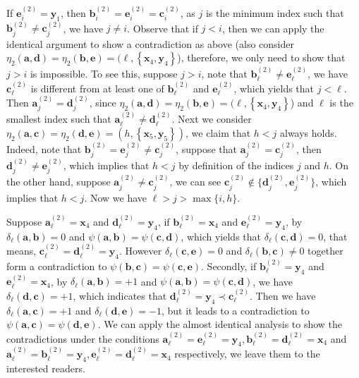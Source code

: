 \documentclass[11pt]{article}
\theoremstyle{definition}
\newcommand{\aaa}{\boldsymbol{a}}
\newcommand{\bb}{\boldsymbol{b}}
\newcommand{\cc}{\boldsymbol{c}}
\newcommand{\dd}{\boldsymbol{d}}
\newcommand{\ee}{\boldsymbol{e}}
\begin{document}
\begin{Case}
\begin{Case}
        \item If $\ee_{i}^{(2)}=\boldsymbol{y}_{1}$, then $\bb_{i}^{(2)}=\ee_{i}^{(2)}=\cc_{i}^{(2)}$, as $j$ is the minimum index such that $\bb_{j}^{(2)}\neq\cc_{j}^{(2)}$, we have $j\neq i$. Observe that if $j<i$, then we can apply the identical argument to show a contradiction as above (also consider $\eta_{2}(\aaa,\dd)=\eta_{2}(\bb,\ee)=(\ell,\left\{\boldsymbol{x}_{4},\boldsymbol{y}_{4}\right\}$), therefore, we only need to show that $j>i$ is impossible. To see this, suppose $j>i$, note that $\bb_{\ell}^{(2)}\neq \ee_{\ell}^{(2)}$, we have $\cc_{\ell}^{(2)}$ is different from at least one of $\bb_{\ell}^{(2)}$ and $\ee_{\ell}^{(2)}$, which yields that $j<\ell$. Then  $\aaa_{j}^{(2)}=\dd_{j}^{(2)}$, since $\eta_{2}(\aaa,\dd)=\eta_{2}(\bb,\ee)=(\ell,\left\{\boldsymbol{x}_{4},\boldsymbol{y}_{4}\right\}$) and $\ell$ is the smallest index such that $\aaa_{\ell}^{(2)}\neq\dd_{\ell}^{(2)}$. Next we consider $\eta_{2}(\aaa,\cc)=\eta_{2}(\dd,\ee)=(h,\left\{\boldsymbol{x}_{5},\boldsymbol{y}_{5}\right\})$, we claim that $h<j$ always holds. Indeed, note that $\bb_{j}^{(2)}=\ee_{j}^{(2)}\neq\cc_{j}^{(2)}$, suppose that $\aaa_{j}^{(2)}=\cc_{j}^{(2)}$, then $\dd_{j}^{(2)}\neq\ee_{j}^{(2)}$, which implies that $h<j$ by definition of the indices $j$ and $h$. On the other hand, suppose $\aaa_{j}^{(2)}\neq\cc_{j}^{(2)}$, we can see $\cc_{j}^{(2)}\notin\{\dd_{j}^{(2)},\ee_{j}^{(2)}\}$, which implies that $h<j$. Now we have $\ell>j> \max\{i,h\}$.
        
         Suppose $\aaa_{\ell}^{(2)}=\boldsymbol{x}_{4}$ and $\dd_{\ell}^{(2)}=\boldsymbol{y}_{4}$, if $\bb_{\ell}^{(2)}=\boldsymbol{x}_{4}$ and $\ee_{\ell}^{(2)}=\boldsymbol{y}_{4}$, by $\delta_{\ell}(\aaa,\bb)=0$ and $\psi(\aaa,\bb)=\psi(\cc,\dd)$, which yields that $\delta_{\ell}(\cc,\dd)=0$, that means, $\cc_{\ell}^{(2)}=\dd_{\ell}^{(2)}=\boldsymbol{y}_{4}$. However $\delta_{\ell}(\cc,\ee)=0$ and $\delta_{\ell}(\bb,\cc)\neq 0$ together form a contradiction to $\psi(\bb,\cc)=\psi(\cc,\ee)$. Secondly, if $\bb_{\ell}^{(2)}=\boldsymbol{y}_{4}$ and $\ee_{\ell}^{(2)}=\boldsymbol{x}_{4}$, by $\delta_{\ell}(\aaa,\bb)=+1$ and $\psi(\aaa,\bb)=\psi(\cc,\dd)$, we have $\delta_{\ell}(\dd,\cc)=+1$, which indicates that $\dd_{\ell}^{(2)}=\boldsymbol{y}_{4}\prec\cc_{\ell}^{(2)}$. Then we have $\delta_{\ell}(\aaa,\cc)=+1$ and $\delta_{\ell}(\dd,\ee)=-1$, but it leads to a contradiction to $\psi(\aaa,\cc)=\psi(\dd,\ee)$. We can apply the almost identical analysis to show the contradictions under the conditions $\aaa_{\ell}^{(2)}=\ee_{\ell}^{(2)}=\boldsymbol{y}_{4},\bb_{\ell}^{(2)}=\dd_{\ell}^{(2)}=\boldsymbol{x}_{4}$ and $\aaa_{\ell}^{(2)}=\bb_{\ell}^{(2)}=\boldsymbol{y}_{4},\ee_{\ell}^{(2)}=\dd_{\ell}^{(2)}=\boldsymbol{x}_{4}$ respectively, we leave them to the interested readers.
          
    \end{Case}
\end{Case}
\end{document}
